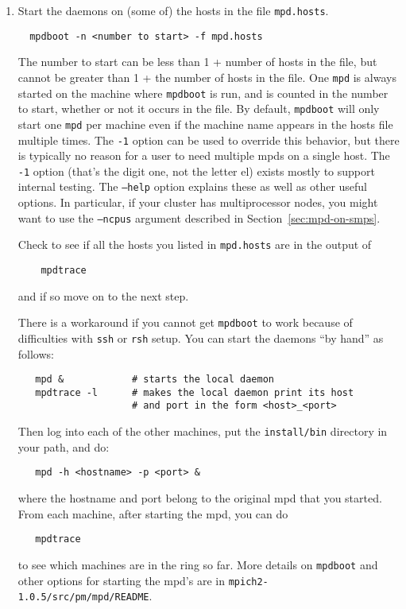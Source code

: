 \documentclass[dvipdfm,11pt]{article}
\begin{document}
\begin{enumerate}
\item
Start the daemons on (some of) the hosts in the file \texttt{mpd.hosts}.
\begin{verbatim}
  mpdboot -n <number to start> -f mpd.hosts
\end{verbatim}
The number to start can be less than 1 + number of hosts in the
file, but cannot be greater than 1 + the number of hosts in the
file.  One \texttt{mpd} is always started on the machine where
\texttt{mpdboot} is 
run, and is counted in the number to start, whether or not it occurs
in the file.  By default, \texttt{mpdboot} will only start one \texttt{mpd} per
machine even if the machine name appears in the hosts file multiple times.
The \texttt{-1} option can be used to override this behavior, but there is typically
no reason for a user to need multiple mpds on a single host.
The \texttt{-1} option (that's the digit one, not the letter el) exists mostly
to support internal testing. 
The \texttt{--help} option explains these as well as other useful
options.  In particular, if your cluster has multiprocessor nodes, you
might want to use the \texttt{--ncpus} argument described in 
Section~\ref{sec:mpd-on-smps}.

Check to see if all the hosts you listed in \texttt{mpd.hosts} are in the output
of 
\begin{verbatim}
    mpdtrace
\end{verbatim}
and if so move on to the next step.

There is a workaround if you cannot get \texttt{mpdboot} to work because of 
difficulties with \texttt{ssh} or \texttt{rsh} setup.  You can start the
daemons ``by 
hand'' as follows:
\begin{verbatim}
   mpd &            # starts the local daemon
   mpdtrace -l      # makes the local daemon print its host
                    # and port in the form <host>_<port>
\end{verbatim}
Then log into each of the other machines, put the \texttt{install/bin}
directory in your path, and do:
\begin{verbatim}
   mpd -h <hostname> -p <port> &
\end{verbatim}
where the hostname and port belong to the original mpd that you
started.  From each machine, after starting the mpd, you can do 
\begin{verbatim}
   mpdtrace
\end{verbatim}
to see which machines are in the ring so far.  More details on
\texttt{mpdboot} and other options for starting the mpd's are in
\texttt{mpich2-1.0.5/src/pm/mpd/README}.


\end{enumerate}
\end{document}
